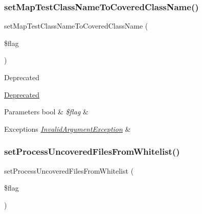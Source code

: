 \subsubsection{\texorpdfstring{set\+Map\+Test\+Class\+Name\+To\+Covered\+Class\+Name()}{setMapTestClassNameToCoveredClassName()}}
{\footnotesize\ttfamily set\+Map\+Test\+Class\+Name\+To\+Covered\+Class\+Name (\begin{DoxyParamCaption}\item[{}]{\$flag }\end{DoxyParamCaption})}

\begin{DoxyRefDesc}{Deprecated}
\item[\mbox{\hyperlink{deprecated__deprecated000026}{Deprecated}}]\end{DoxyRefDesc}



\begin{DoxyParams}[1]{Parameters}
bool & {\em \$flag} & \\
\hline
\end{DoxyParams}

\begin{DoxyExceptions}{Exceptions}
{\em \mbox{\hyperlink{class_sebastian_bergmann_1_1_code_coverage_1_1_invalid_argument_exception}{Invalid\+Argument\+Exception}}} & \\
\hline
\end{DoxyExceptions}
\mbox{\label{class_sebastian_bergmann_1_1_code_coverage_1_1_code_coverage_ae74f3c174591e178c96db3c38b215f4e}} 
\subsubsection{\texorpdfstring{set\+Process\+Uncovered\+Files\+From\+Whitelist()}{setProcessUncoveredFilesFromWhitelist()}}
{\footnotesize\ttfamily set\+Process\+Uncovered\+Files\+From\+Whitelist (\begin{DoxyParamCaption}\item[{}]{\$flag }\end{DoxyParamCaption})}


